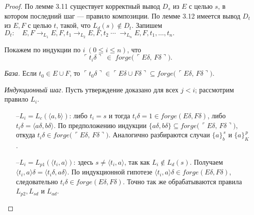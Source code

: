 \begin{proof}
По лемме 3.11 существует корректный вывод
$D_s$ из $E$ с целью $s$, в котором последний шаг — правило композиции.
По лемме 3.12 имеется вывод
$D_t$ из $E,F$ с целью $t$, такой, что $L_d(s)\notin D_t$.
Запишем
\(
  D_t:\quad
  E,F \rightarrow_{L_1} E,F,t_1
       \rightarrow_{L_2} E,F,t_2
       \;\cdots\;
       \rightarrow_{L_n} E,F,t_1,\dots,t_n .
\)

Покажем по индукции по $i\;(0\le i\le n)$, что
\[
  \ulcorner t_i\delta\urcorner\;\in\;
   forge\!\bigl(\,\ulcorner E\delta,\,F\delta\urcorner\bigr).
\]

\noindent\emph{База.}
Если $t_0\in E\cup F$, то
\(
  \ulcorner t_0\delta\urcorner\in
  \ulcorner E\delta\cup F\delta\urcorner
  \subseteq
  forge\!\bigl(\,\ulcorner E\delta,\,F\delta\urcorner\bigr).
\)

\emph{Индукционный шаг.}
Пусть утверждение доказано для всех $j<i$; рассмотрим правило $L_i$.

\begin{itemize}
  \item[--$L_i=L_c(\langle a,b\rangle)$:]
        либо $t_i=s$ и тогда
        $t_i\delta=1\in forge(E\delta,F\delta)$,
        либо
        $t_i\delta=\langle a\delta,b\delta\rangle$.
        По предположению индукции
        $\{a\delta,b\delta\}\subseteq
          forge\!\bigl(\,\ulcorner E\delta,\,F\delta\urcorner\bigr)$,
        откуда
        $t_i\delta\in
         forge\!\bigl(\,\ulcorner E\delta,\,F\delta\urcorner\bigr)$.
        Аналогично разбираются случаи $\{a\}_b^{\,s}$ и $\{a\}_K^{\,p}$.

  \item[--$L_i=L_{p1}(\langle t_i,a\rangle)$:]
        здесь $s\neq\langle t_i,a\rangle$,
        так как $L_i\notin L_d(s)$.
        Получаем
        $\langle t_i,a\rangle\delta=\langle t_i\delta,a\delta\rangle$.
        По индукционной гипотезе
        $\langle t_i,a\rangle\delta\in
         forge(E\delta,F\delta)$,
        следовательно
        $t_i\delta\in forge(E\delta,F\delta)$.
        Точно так же обрабатываются правила
        $L_{p2},L_{sd}$ и $L_{ad}$.


\end{itemize}
\end{proof}
